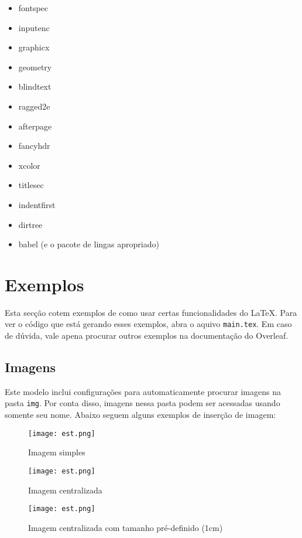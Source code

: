 \documentclass[twoside, 11pt]{article}
\begin{document}
\begin{itemize}
    \item fontspec
    \item inputenc
    \item graphicx
    \item geometry
    \item blindtext
    \item ragged2e
    \item afterpage
    \item fancyhdr
    \item xcolor
    \item titlesec
    \item indentfirst
    \item dirtree
    \item babel (e o pacote de lingas apropriado)
  \end{itemize}

\section{Exemplos}

Esta secção cotem exemplos de como usar certas funcionalidades do \LaTeX \space.
Para ver o código que está gerando esses exemplos, abra o aquivo \texttt{main.tex}.
Em caso de dúvida, vale apena procurar outros exemplos na documentação do Overleaf.

\subsection{Imagens}




Este modelo inclui configurações para automaticamente procurar imagens na pasta \texttt{img}.
Por conta disso, imagens nessa pasta podem ser acessadas usando somente seu nome. 
Abaixo seguem alguns exemplos de inserção de imagem:



\begin{figure}[ht]
    \texttt{[image: est.png]}
    \caption{Imagem simples}
\end{figure}

\begin{figure}[ht]
    \texttt{[image: est.png]}
    \caption{Imagem centralizada}
\end{figure}

\begin{figure}[ht]
    \texttt{[image: est.png]}
    \caption{Imagem centralizada com tamanho pré-definido (1cm)}
\end{figure}
\end{document}
